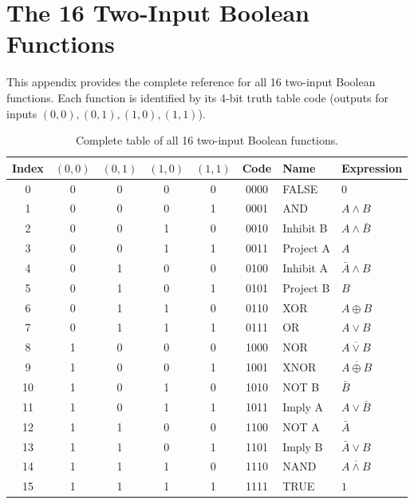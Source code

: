 \chapter{The 16 Two-Input Boolean Functions}
\label{app:gates}

This appendix provides the complete reference for all 16 two-input
Boolean functions. Each function is identified by its 4-bit truth
table code (outputs for inputs $(0,0), (0,1), (1,0), (1,1)$).

\begin{table}[htbp]
\centering
\caption{Complete table of all 16 two-input Boolean functions.}
\label{tab:all-16-full}
\begin{tabular}{@{}ccccccll@{}}
  \toprule
  \textbf{Index} & $(0,0)$ & $(0,1)$ & $(1,0)$ & $(1,1)$
    & \textbf{Code} & \textbf{Name} & \textbf{Expression} \\
  \midrule
  0  & 0 & 0 & 0 & 0 & 0000 & FALSE     & $0$ \\
  1  & 0 & 0 & 0 & 1 & 0001 & AND       & $A \wedge B$ \\
  2  & 0 & 0 & 1 & 0 & 0010 & Inhibit B & $A \wedge \bar{B}$ \\
  3  & 0 & 0 & 1 & 1 & 0011 & Project A & $A$ \\
  4  & 0 & 1 & 0 & 0 & 0100 & Inhibit A & $\bar{A} \wedge B$ \\
  5  & 0 & 1 & 0 & 1 & 0101 & Project B & $B$ \\
  6  & 0 & 1 & 1 & 0 & 0110 & XOR       & $A \oplus B$ \\
  7  & 0 & 1 & 1 & 1 & 0111 & OR        & $A \vee B$ \\
  8  & 1 & 0 & 0 & 0 & 1000 & NOR       & $\overline{A \vee B}$ \\
  9  & 1 & 0 & 0 & 1 & 1001 & XNOR      & $\overline{A \oplus B}$ \\
  10 & 1 & 0 & 1 & 0 & 1010 & NOT B     & $\bar{B}$ \\
  11 & 1 & 0 & 1 & 1 & 1011 & Imply A   & $A \vee \bar{B}$ \\
  12 & 1 & 1 & 0 & 0 & 1100 & NOT A     & $\bar{A}$ \\
  13 & 1 & 1 & 0 & 1 & 1101 & Imply B   & $\bar{A} \vee B$ \\
  14 & 1 & 1 & 1 & 0 & 1110 & NAND      & $\overline{A \wedge B}$ \\
  15 & 1 & 1 & 1 & 1 & 1111 & TRUE      & $1$ \\
  \bottomrule
\end{tabular}
\end{table}


